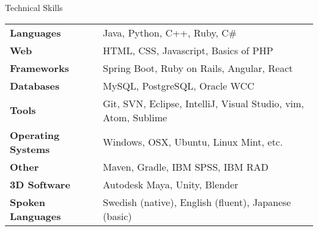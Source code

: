 \documentclass{resume} %
\begin{document}

\begin{rSection}{Technical Skills}

\begin{tabular}{ @{} >{\bfseries}l @{\hspace{6ex}} l }
Languages & Java, Python, C++, Ruby, C\# \\
Web & HTML, CSS, Javascript, Basics of PHP \\
Frameworks & Spring Boot, Ruby on Rails, Angular, React \\
Databases & MySQL, PostgreSQL, Oracle WCC \\
Tools & Git, SVN, Eclipse, IntelliJ, Visual Studio, vim, Atom, Sublime \\
Operating Systems & Windows, OSX, Ubuntu, Linux Mint, etc. \\
Other & Maven, Gradle, IBM SPSS, IBM RAD \\
3D Software & Autodesk Maya, Unity, Blender \\
Spoken Languages & Swedish (native), English (fluent), Japanese (basic) \\
\end{tabular}

\end{rSection}





\end{document}
